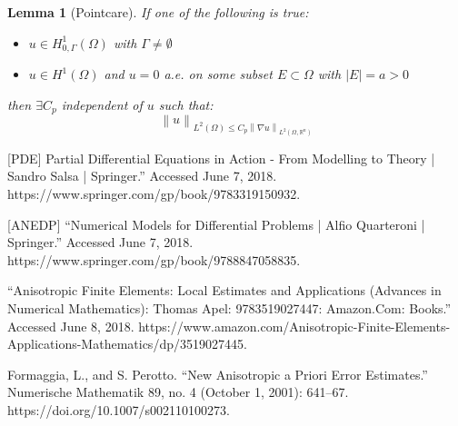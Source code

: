 \documentclass[conference]{IEEEtran}
\newcommand{\norm}[1]{\left\lVert#1\right\rVert}
\newtheorem{theorem}{Theorem}[section]
\newtheorem{lemma}[theorem]{Lemma}
\begin{document}
\begin{lemma}[Pointcare]
\label{th:pointcare}
If one of the following is true:
\begin{itemize}
\item $u \in H^1_{0,\Gamma}(\Omega)$ with $\Gamma \neq \emptyset$ \\
\item $u \in H^1(\Omega) $ and $u=0$ a.e. on some subset $E\subset \Omega $ with $|E|=a>0$ \\
\end{itemize}

then $\exists C_p$ independent of $u$ such that:
\begin{equation}
	\norm{u}_{L^2(\Omega) \leq C_p \norm{\nabla u}_{L^2(\Omega,\mathbb{R}^n)}}	
\end{equation}
\end{lemma}

%


\begin{thebibliography}{1}

[PDE]
Partial Differential Equations in Action - From Modelling to Theory | Sandro Salsa | Springer.” Accessed June 7, 2018. https://www.springer.com/gp/book/9783319150932.

[ANEDP]
“Numerical Models for Differential Problems | Alfio Quarteroni | Springer.” Accessed June 7, 2018. https://www.springer.com/gp/book/9788847058835.

“Anisotropic Finite Elements: Local Estimates and Applications (Advances in Numerical Mathematics): Thomas Apel: 9783519027447: Amazon.Com: Books.” Accessed June 8, 2018. https://www.amazon.com/Anisotropic-Finite-Elements-Applications-Mathematics/dp/3519027445.

Formaggia, L., and S. Perotto. “New Anisotropic a Priori Error Estimates.” Numerische Mathematik 89, no. 4 (October 1, 2001): 641–67. https://doi.org/10.1007/s002110100273.



\end{thebibliography}
\end{document}
